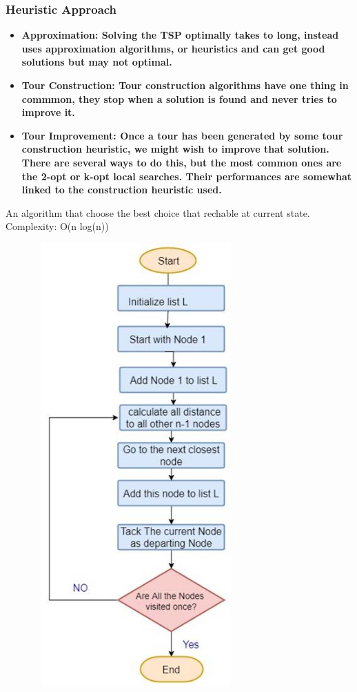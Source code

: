 \documentclass[12pt]{article}
\newcounter{subsubsubsection}[subsubsection]
\begin{document}
\subsubsection{ Heuristic Approach }

\begin{itemize}
\item \bf{Approximation}: 
Solving the TSP optimally takes to long, instead uses approximation algorithms, or heuristics and can get good solutions but may not optimal.
\item \bf{Tour Construction}:
Tour construction algorithms have one thing in commmon,
they stop when a solution is found and never
tries to improve it.
\item \bf{Tour Improvement}:
Once a tour has been generated by some tour construction
heuristic, we might wish to improve that solution.
There are several ways to do this, but the most
common ones are the 2-opt or k-opt local searches.
Their performances are somewhat linked to the construction
heuristic used.
\end{itemize}
\newpage
{}
An algorithm that choose the best choice that rechable at current state.
Complexity: O(n log(n))
\begin{center}
	\includegraphics[width=10cm,height=17cm]{./assets/flowchart/greedy.png}\\
\end{center}
\end{document}
